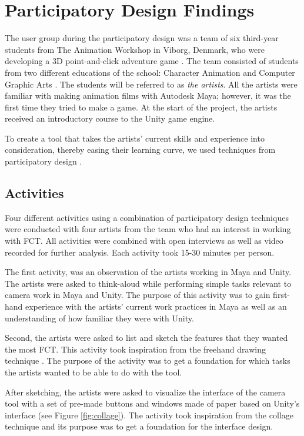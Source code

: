 \section{Participatory Design Findings} \label{PD_Findings}
The user group during the participatory design was a team of six third-year students from The Animation Workshop in Viborg, Denmark, who were developing a 3D point-and-click adventure game \cite{adventure_genre}. The team consisted of students from two different educations of the school: Character Animation and Computer Graphic Arts \cite{taw_degrees}. The students will be referred to as \textit{the artists}. All the artists were familiar with making animation films with Autodesk Maya; however, it was the first time they tried to make a game. At the start of the project, the artists received an introductory course to the Unity game engine.

To create a tool that takes the artists' current skills and experience into consideration, thereby easing their learning curve, we used techniques from participatory design \cite{part_design}.

\subsection{Activities}
Four different activities using a combination of participatory design techniques were conducted with four artists from the team who had an interest in working with FCT. All activities were combined with open interviews as well as video recorded for further analysis. Each activity took 15-30 minutes per person.

The first activity, was an observation \cite{part_design} of the artists working in Maya and Unity. The artists were asked to think-aloud \cite{part_design} while performing simple tasks relevant to camera work in Maya and Unity. The purpose of this activity was to gain first-hand experience with the artists' current work practices in Maya as well as an understanding of how familiar they were with Unity.

Second, the artists were asked to list and sketch the features that they wanted the most FCT. This activity took inspiration from the freehand drawing technique \cite{part_design}. The purpose of the activity was to get a foundation for which tasks the artists wanted to be able to do with the tool.

After sketching, the artists were asked to visualize the interface of the camera tool with a set of pre-made buttons and windows made of paper based on Unity's interface (see Figure \ref{fig:collage}). The activity took inspiration from the collage technique \cite{part_design} and its purpose was to get a foundation for the interface design.

